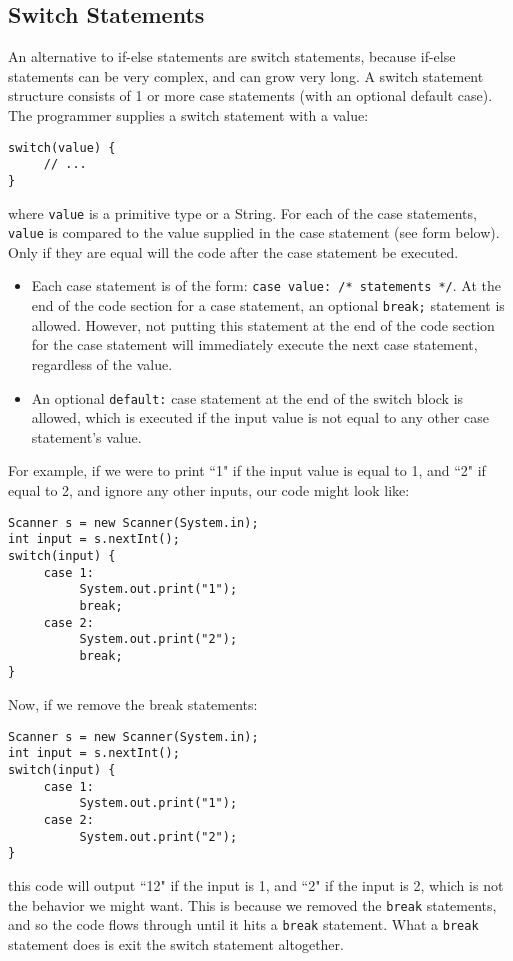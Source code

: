\subsection{Switch Statements}
An alternative to if-else statements are switch statements, because if-else statements can be very complex, and can grow very long. A switch statement structure consists of 1 or more case statements (with an optional default case). The programmer supplies a switch statement with a value:
\begin{lstlisting}
switch(value) {
     // ...
}
\end{lstlisting}
where \verb|value| is a primitive type or a String. For each of the case statements, \verb|value| is compared to the value supplied in the case statement (see form below). Only if they are equal will the code after the case statement be executed.
\begin{itemize}
\item Each case statement is of the form: \verb|case value: /* statements */|. At the end of the code section for a case statement, an optional \verb|break;| statement is allowed. However, not putting this statement at the end of the code section for the case statement will immediately execute the next case statement, regardless of the value.
\item An optional \verb|default:| case statement at the end of the switch block is allowed, which is executed if the input value is not equal to any other case statement's value.
\end{itemize}
For example, if we were to print ``1" if the input value is equal to 1, and ``2" if equal to 2, and ignore any other inputs, our code might look like:
\begin{lstlisting}
Scanner s = new Scanner(System.in);
int input = s.nextInt();
switch(input) {
     case 1:
          System.out.print("1");
          break;
     case 2:
          System.out.print("2");
          break;
}
\end{lstlisting}
Now, if we remove the break statements:
\begin{lstlisting}
Scanner s = new Scanner(System.in);
int input = s.nextInt();
switch(input) {
     case 1:
          System.out.print("1");
     case 2:
          System.out.print("2");
}
\end{lstlisting}
this code will output ``12" if the input is 1, and ``2" if the input is 2, which is not the behavior we might want. This is because we removed the \verb|break| statements, and so the code flows through until it hits a \verb|break| statement. What a \verb|break| statement does is exit the switch statement altogether.
